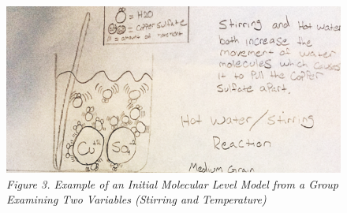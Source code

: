 \documentclass[11pt]{sig-alternate}
\begin{document}
\begin{large}
\begin{figure} [h]
    \centering
    \includegraphics[width=\linewidth]{figure3.PNG}
    \captionsetup{font=large, labelfont=it}
    \caption*{\textit {Figure 3. Example of an Initial Molecular Level Model from a Group Examining Two Variables (Stirring and Temperature)}}
    \label{fig3}
\end{figure}


\end{large}
\end{document}
